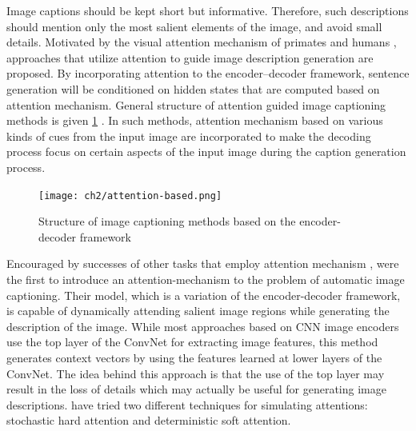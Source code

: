 Image captions should be kept short but informative. Therefore, such descriptions should mention only the most salient elements of the image, and avoid small details. Motivated by the visual attention mechanism of primates and humans \citep{Rensink2000, Spratling2004} , approaches that utilize attention to guide image description generation are proposed. By incorporating attention to the encoder–decoder framework, sentence generation will be conditioned on hidden states that are computed based on attention mechanism. General structure of attention guided image captioning methods is given \ref{fig:attention-based} . In such methods, attention mechanism based on various kinds of cues from the input image are incorporated to make the decoding process focus on certain aspects of the input image during the caption generation process.

\begin{figure}[hpt]
	\centering
	\texttt{[image: ch2/attention-based.png]}
	\caption{Structure of image captioning methods based on the encoder-decoder framework}
	\label{fig:attention-based}
\end{figure}

Encouraged by successes of other tasks that employ attention mechanism \citet{Mnih2014, LeiBa2015}, \citet{Xu2015} were the first to introduce an attention-mechanism to the problem of automatic image captioning. Their model, which is a variation of the encoder-decoder framework, is capable of dynamically attending salient image regions while generating the description of the image. While most approaches based on CNN image encoders use the top layer of the ConvNet for extracting image features, this method generates context vectors by using the features learned at lower layers of the ConvNet. The idea behind this approach is that the use of the top layer may result in the loss of details which may actually be useful for generating image descriptions. \citeauthor{Xu2015} have tried two different techniques for simulating attentions: stochastic hard attention and deterministic soft attention.


